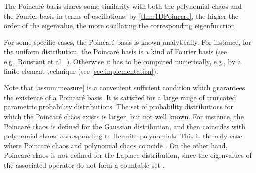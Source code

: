 \documentclass[a4paper,11pt]{article}
\renewcommand{\citep}[2][]{\cite[#1]{#2}}
\renewcommand{\citet}[2][]{\cite[#1]{#2}}
\theoremstyle{definition}
\theoremstyle{remark}
\theoremstyle{theorem}
\begin{document}
The Poincar\'e basis shares some similarity with both the polynomial chaos and the Fourier basis in terms of oscillations:
by \cref{thm:1DPoincare}, the higher the order of the eigenvalue, the more oscillating the corresponding eigenfunction.  

For some specific cases, the Poincar\'e basis is known analytically. For instance, for the uniform distribution, the Poincar\'e basis is a kind of Fourier basis (see e.g.\ Roustant et al.~\citet[\S 4]{rougam20}). Otherwise it has to be computed numerically, e.g., by a finite element technique (see \cref{sec:implementation}). 

Note that \cref{assum:measure} is a convenient sufficient condition which guarantees the existence of a Poincar\'e basis.
It is satisfied for a large range of truncated parametric probability distributions. The set of probability distributions for which the Poincar\'e chaos exists is larger, but not well known.
For instance, the Poincar\'e chaos is defined for the Gaussian distribution, and then coincides with polynomial chaos, corresponding to Hermite polynomials. This is the only case where Poincar\'e chaos and polynomial chaos coincide \citep[\S 2.7]{BGL_book}. On the other hand, Poincar\'e chaos is not defined for the Laplace distribution, since the eigenvalues of the associated operator do not form a countable set \citep[\S 4.4.1]{BGL_book}. 
\end{document}
